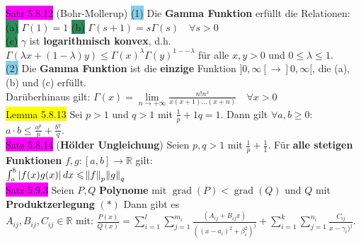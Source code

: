 \documentclass[10pt]{article}
\begin{document}
\colorbox{magenta}{Satz 5.8.12} (Bohr-Mollerup) \colorbox{SkyBlue}{(1)} 
                Die \textbf{Gamma Funktion} erfüllt die Relationen: \\
        \indent\indent \colorbox{SeaGreen}{(a)}
                \textcolor{NavyBlue}{$\Gamma(1)=1$} \qquad
                \colorbox{SeaGreen}{(b)} 
                \textcolor{NavyBlue}{$\Gamma(s+1)=s\Gamma(s)\quad\forall s>0$} \\
        \indent\indent \colorbox{SeaGreen}{(c)} \textcolor{NavyBlue}{$\gamma$} ist 
                \textbf{logarithmisch konvex}, d.h. 
                \textcolor{NavyBlue}{$\Gamma(\lambda x+(1-\lambda)y)
                \leqslant\Gamma(x)^\lambda\Gamma(y)^{1--\lambda}$}
                für alle \textcolor{NavyBlue}{$x,y>0$} und 
                \textcolor{NavyBlue}{$0\leqslant\lambda\leqslant1$}.\\
        \indent \colorbox{SkyBlue}{(2)} Die \textbf{Gamma Funktion} ist die 
                \textbf{einzige} Funktion 
                \textcolor{NavyBlue}{$]0,\infty[\longrightarrow]0,\infty[$},
                die (a), (b) und (c) erfüllt. \\
        \indent\indent Darüberhinaus gilt: 
                \textcolor{NavyBlue}{$\Gamma(x)
                =\lim\limits_{n\to+\infty}\frac{n!n^x}{x(x+1)...(x+n)}\quad
                \forall x>0$}\\
\colorbox{yellow}{Lemma 5.8.13} Sei \textcolor{NavyBlue}{$p>1$} und 
                \textcolor{NavyBlue}{$q>1$} mit 
                \textcolor{NavyBlue}{$\frac{1}{p}+{1}{q}=1$}. Dann gilt 
                \textcolor{NavyBlue}{$\forall a,b\geqslant0$}: 
                \textcolor{NavyBlue}{$a\cdot b\leqslant\frac{a^p}{p}+\frac{b^q}{q}$}.\\
\colorbox{magenta}{Satz 5.8.14} (\textbf{Hölder Ungleichung}) Seien 
                \textcolor{NavyBlue}{$p,q>1$} mit 
                \textcolor{NavyBlue}{$\frac{1}{p}+\frac{1}{1}$}. Für 
                \textbf{alle stetigen Funktionen} 
                \textcolor{NavyBlue}{$f,g:[a,b]\longrightarrow\mathbb{R}$} gilt: \\
        \indent \textcolor{NavyBlue}{$\int_a^b|f(x)g(x)|\,dx\leqslant\norm{f}_p\norm{g}_q$}\\
\colorbox{magenta}{Satz 5.9.3} Seien \textcolor{NavyBlue}{$P,Q$} \textbf{Polynome} mit 
                \textcolor{NavyBlue}{$\operatorname{grad}(P)<\operatorname{grad}(Q)$} und 
                \textcolor{NavyBlue}{$Q$}
                mit \textbf{Produktzerlegung} $(*)$ Dann gibt es \\
        \indent \textcolor{NavyBlue}{$A_{ij},B_{ij},C_{ij}\in\mathbb{R}$} mit: 
                \textcolor{NavyBlue}{$\frac{P(x)}{Q(x)}
                =\sum_{i=1}^l\sum_{j=1}^{m_i}
                \frac{(A_{ij}+B_{ij}x)}{((x-a_i)^2+\beta_i^2)^j}
                +\sum_{i=1}^k\sum_{j=1}^{n_i}\frac{C_{ij}}{x-\gamma_i)^j}$}.
\end{document}
